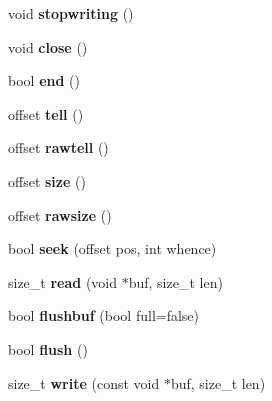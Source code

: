 \begin{DoxyCompactItemize}
void {\bfseries stopwriting} ()
\item 
\mbox{\label{structgzstream_a6b7351f0159775427d057bf943616586}} 
void {\bfseries close} ()
\item 
\mbox{\label{structgzstream_a48d86482e0ce4b9c9366a142bf508bf9}} 
bool {\bfseries end} ()
\item 
\mbox{\label{structgzstream_a223b6be23775308a71a0b89306ca6699}} 
offset {\bfseries tell} ()
\item 
\mbox{\label{structgzstream_a6dbe81bda0ed7df67d3f2a7de2f220ec}} 
offset {\bfseries rawtell} ()
\item 
\mbox{\label{structgzstream_a4ce93622b9e6f397253e3918f7f6576f}} 
offset {\bfseries size} ()
\item 
\mbox{\label{structgzstream_accf7a7e788746b542fe5a8d4d4f29156}} 
offset {\bfseries rawsize} ()
\item 
\mbox{\label{structgzstream_a40cd78f7ee55c7a699f558a97dc8b757}} 
bool {\bfseries seek} (offset pos, int whence)
\item 
\mbox{\label{structgzstream_a4181c3543a5af7649e7e07fd7e9c69fe}} 
size\+\_\+t {\bfseries read} (void $\ast$buf, size\+\_\+t len)
\item 
\mbox{\label{structgzstream_aac92c3ac4dbee68231652e59a678daae}} 
bool {\bfseries flushbuf} (bool full=false)
\item 
\mbox{\label{structgzstream_a72f08de4d18360defb6341b814f38374}} 
bool {\bfseries flush} ()
\item 
\mbox{\label{structgzstream_a68167b020a7931ad0e840dc46f0b70bb}} 
size\+\_\+t {\bfseries write} (const void $\ast$buf, size\+\_\+t len)
\end{DoxyCompactItemize}
